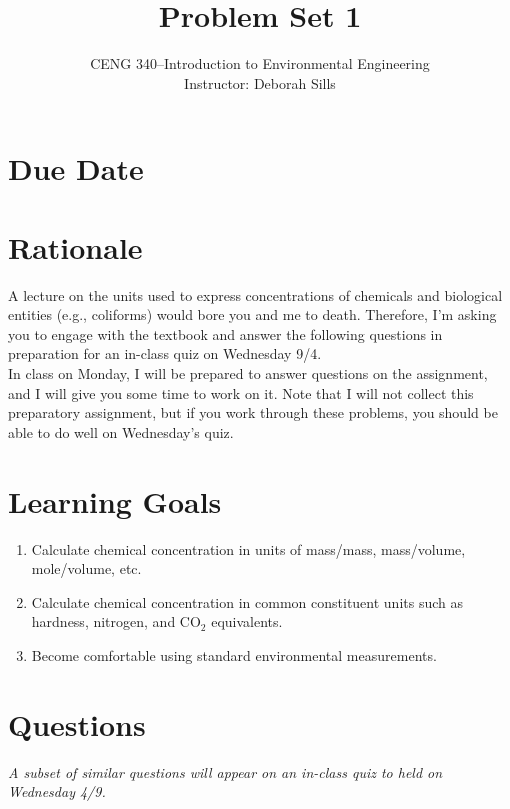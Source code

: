 \documentclass[12pt,letterpaper]{article}
\begin{document}
\setlength{\parindent}{0cm} 


\frenchspacing

\title {Problem Set 1} 
\author {CENG 340--Introduction to Environmental Engineering\\
Instructor: Deborah Sills}
\maketitle

\section *{Due Date}

\section *{Rationale}
A lecture on the units used to express concentrations of chemicals and biological entities (e.g., coliforms) would bore you and me to death. Therefore, I'm asking you to engage with the textbook and answer the following questions in preparation for an in-class quiz on Wednesday 9/4.\\

In class on Monday, I will be prepared to answer questions on the assignment, and I will give you some time to work on it. Note that I will not collect this preparatory assignment, but if you work through these problems, you should be able to do well on Wednesday's quiz.

\section *{Learning Goals}
\begin{enumerate}
\item Calculate chemical concentration in units of mass/mass, mass/volume, mole/volume, etc.
\item Calculate chemical concentration in common constituent units such as hardness, nitrogen, and CO$_2$ equivalents. 
\item Become comfortable using standard environmental measurements.
\end{enumerate}

\section *{Questions}
\emph{A subset of similar questions will appear on an in-class quiz to held on Wednesday 4/9.}
\end{document}
